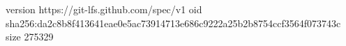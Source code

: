 version https://git-lfs.github.com/spec/v1
oid sha256:da2c8b8f413641eae0e5ac73914713e686c9222a25b2b8754ccf3564f073743c
size 275329
